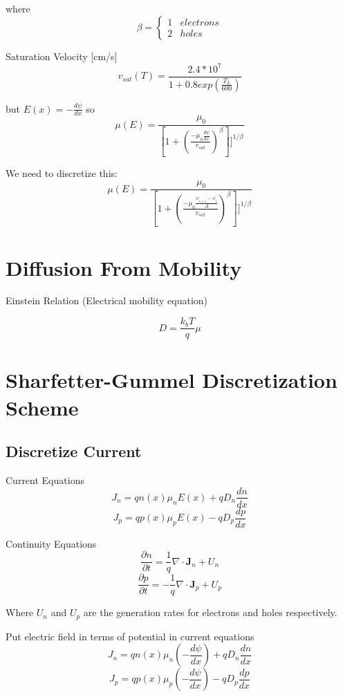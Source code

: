 \documentclass[12pt]{article}
\begin{document}
where 
\[
\beta = 
\begin{cases} 
1 & electrons\\
2 & holes
\end{cases}
\]

Saturation Velocity [cm/s]
\[
v_{sat}(T)=\frac{2.4*10^{7}}{1+0.8exp(\frac{T_{L}}{600})}
\]

but $ E(x)=-\frac{d\psi}{dx}$ so
\[
\mu(E)=\frac{\mu_{0}}{[1+(\frac{-\mu_{0}\frac{d\psi}{dx}}{v_{sat}})^{\beta}]]^{1/\beta}}
\]

We need to discretize this:
\[
\mu(E)=\frac{\mu_{0}}{[1+(\frac{-\mu_{0}\frac{\psi_{i+1}-\psi_{i}}{\Delta}}{v_{sat}})^{\beta}]]^{1/\beta}}
\]

\section{Diffusion From Mobility \cite{Pierret1996}}

Einstein Relation (Electrical mobility equation)

\[
D= \frac{k_{b}T}{q}\mu
\]



\section{Sharfetter-Gummel Discretization Scheme \cite[p.169]{Vasileska2006}}
\subsection{Discretize Current}
Current Equations
\begin{equation}
J_{n}=qn(x)\mu_{n}E(x)+qD_{n}\frac{dn}{dx}
\end{equation}
\begin{equation}
J_{p}=qp(x)\mu_{p}E(x)-qD_{p}\frac{dp}{dx}
\end{equation}

Continuity Equations
\begin{equation}
\frac{\partial n}{\partial t}=\frac{1}{q} \nabla \cdot \textbf{J}_{n}+U_{n}
\end{equation}
\begin{equation}
\frac{\partial p}{\partial t}=-\frac{1}{q} \nabla \cdot \textbf{J}_{p}+U_{p}
\end{equation}

Where $ U_{n} $ and $ U_{p} $ are the generation rates for electrons and holes respectively.

Put electric field in terms of potential in current equations
\begin{equation}
J_{n}=qn(x)\mu_{n}(-\frac{d\psi}{dx})+qD_{n}\frac{dn}{dx}
\end{equation}
\begin{equation}
J_{p}=qp(x)\mu_{p}(-\frac{d\psi}{dx})-qD_{p}\frac{dp}{dx}
\end{equation}
\end{document}
